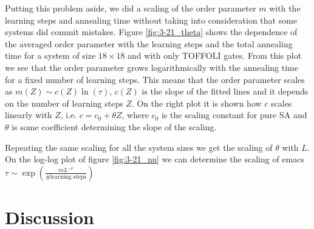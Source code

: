 Putting this problem aside, we did a scaling of the order parameter $m$ with the learning steps and annealing time without taking into consideration that some systems did commit mistakes.
Figure \ref{fig:3-21_theta} shows the dependence of the averaged order parameter with the learning steps and the total annealing time for a system of size $18\times 18$ and with only TOFFOLI gates.
From this plot we see that the order parameter grows logarithmically with the annealing time for a fixed number of learning steps.
This means that the order parameter scales as $m(Z)\sim c(Z) \ln (\tau)$, $c(Z)$ is the slope of the fitted lines and it depends on the number of learning steps $Z$.
On the right plot it is shown how $c$ scales linearly with $Z$, i.e. $c=c_0+\theta Z$, where $c_0$ is the scaling constant for pure SA and $\theta$ is some coefficient determining the slope of the scaling.

Repeating the same scaling for all the system sizes we get the scaling of $\theta$ with $L$.
On the log-log plot of figure \ref{fig:3-21_nu} we can determine the scaling of emacs
$\tau \sim \exp(\frac{m L^{-\nu}}{\# \text{learning steps}})$


\chapter{Discussion}
